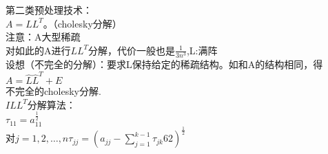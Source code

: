 \documentclass[cjk]{beamer}
\begin{document}
\begin{CJK*}{UTF8}{gbsn}
{	第二类预处理技术：\\
	$A=LL^T$。（cholesky分解）\\
	注意：A大型稀疏\\
	对如此的A进行$LL^T$分解，代价一般也是$\frac{1}{3n^3}$,L:满阵\\
	设想（不完全的分解）：要求L保持给定的稀疏结构。如和A的结构相同，得$A=\hat{L}\hat{L}^T+E$\\
	不完全的cholesky分解.\\
	$ILL^T$分解算法：\\
	$\tau_{11}=a_{11}^{\frac{1}{2}}$\\
	对$j=1,2,\ldots,n \tau_{jj}=(a_{jj}-\sum_{j=1}^{k-1}\tau_{jk}62)^{\frac{1}{2}}$\\
	}
\end{CJK*}
\end{document}
